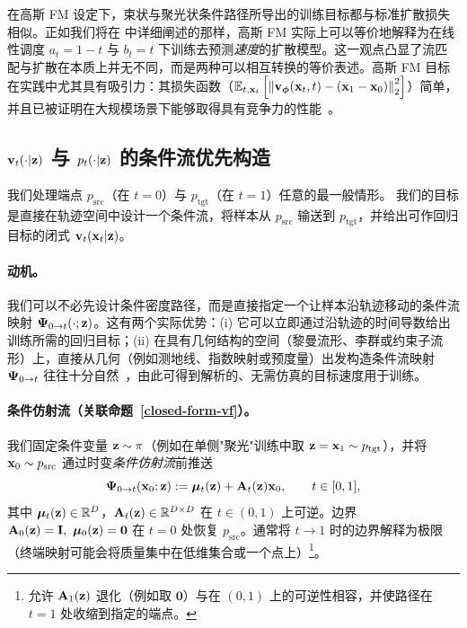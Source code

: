 在高斯 FM 设定下，束状与聚光状条件路径所导出的训练目标都与标准扩散损失相似。正如我们将在  中详细阐述的那样，高斯 FM 实际上可以等价地解释为在线性调度 $a_t = 1-t$ 与 $b_t = t$ 下训练去预测\emph{速度}的扩散模型。这一观点凸显了流匹配与扩散在本质上并无不同，而是两种可以相互转换的等价表述。高斯 FM 目标在实践中尤其具有吸引力：其损失函数（$\mathbb{E}_{t,{\mathbf{x}}_t} \left[\left\lVert{\mathbf{v}}_{\bm{\phi}}({\mathbf{x}}_t, t) - ({\mathbf{x}}_1 - {\mathbf{x}}_0)\right\rVert_2^2\right]$）简单，并且已被证明在大规模场景下能够取得具有竞争力的性能~\citep{esser2024scaling}。




\subsection{${\mathbf{v}}_t(\cdot|{\mathbf{z}})$ 与 $p_t(\cdot|{\mathbf{z}})$ 的条件流优先构造}\label{subsec:prob-path-flow}

我们处理端点 $p_{\mathrm{src}}$（在 $t=0$）与 $p_{\mathrm{tgt}}$（在 $t=1$）任意的最一般情形。
我们的目标是直接在轨迹空间中设计一个条件流，将样本从 $p_{\mathrm{src}}$ 输送到 $p_{\mathrm{tgt}}$，并给出可作回归目标的闭式 ${\mathbf{v}}_t({\mathbf{x}}_t|{\mathbf{z}})$。

\paragraph{动机。}
我们可以不必先设计条件密度路径，而是直接指定一个让样本沿轨迹移动的条件流映射 ${\bm{\Psi}}_{0\to t}(\cdot;{\mathbf{z}})$。这有两个实际优势：(i) 它可以立即通过沿轨迹的时间导数给出训练所需的回归目标；(ii) 在具有几何结构的空间（黎曼流形、李群或约束子流形）上，直接从几何（例如测地线、指数映射或预度量）出发构造条件流映射
${\bm{\Psi}}_{0\to t}$ 往往十分自然~\citep{lipman2024flow}，由此可得到解析的、无需仿真的目标速度用于训练。


\paragraph{条件仿射流（关联命题~\ref{closed-form-vf}）。}
我们固定条件变量 ${\mathbf{z}}\sim\pi$（例如在单侧"聚光"训练中取 ${\mathbf{z}}={\mathbf{x}}_1\sim p_{\mathrm{tgt}}$），并将 ${\mathbf{x}}_0\sim p_{\mathrm{src}}$ 通过时变\emph{条件仿射流}前推送
\[
{\bm{\Psi}}_{0\to t}({\mathbf{x}}_0;{\mathbf{z}}) := \bm\mu_t({\mathbf{z}}) + {\mathbf{A}}_t({\mathbf{z}}) {\mathbf{x}}_0,\qquad t\in[0,1],
\]
其中 $\bm\mu_t({\mathbf{z}})\in\mathbb{R}^D$，${\mathbf{A}}_t({\mathbf{z}})\in\mathbb{R}^{D\times D}$ 在 $t\in(0,1)$ 上可逆。边界
$\rmA_0(\rvz)=\rmI,\ \bm\mu_0(\rvz)=\mathbf 0$ 在 $t=0$ 处恢复 $p_{\mathrm{src}}$。通常将 $t\to1$ 时的边界解释为极限（终端映射可能会将质量集中在低维集合或一个点上）\footnote{允许 ${\mathbf{A}}_1({\mathbf{z}})$ 退化（例如取 $\mathbf 0$）与在 $(0,1)$ 上的可逆性相容，并使路径在 $t=1$ 处收缩到指定的端点。}。


